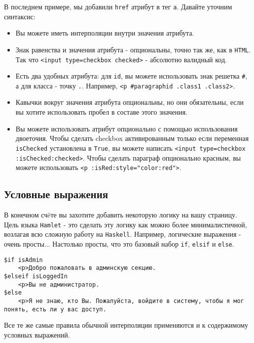 В последнем примере, мы добавили \texttt{href} атрибут в тег \texttt{a}.
Давайте уточним синтаксис:

\begin{itemize}
    \item Вы можете иметь интерполяции внутри значения атрибута.
    \item Знак равенства и значения атрибута - опциональны, точно так же, как в
        \texttt{HTML}.  Так что \lstinline!<input type=checkbox checked>! -
        абсолютно валидный код.
    \item Есть два удобных атрибута: для \lstinline!id!, вы можете использовать
        знак решетка \texttt{\#}, а для класса - точку \texttt{.}. Например,
        \lstinline!<p #paragraphid .class1 .class2>!.
    \item Кавычки вокруг значения атрибута опциональны, но они обязательны,
        если вы хотите использовать пробел в составе этого значения.
    \item Вы можете использовать атрибут опционально с помощью использования
        двоеточия.  Чтобы сделать checkbox активированным только если
        переменная \lstinline!isChecked!  установлена в \lstinline!True!, вы
        можете написать
        \lstinline!<input type=checkbox :isChecked:checked>!.  Чтобы сделать
        параграф опционально красным, вы можете использовать
        \lstinline!<p :isRed:style="color:red">!.
\end{itemize}


\subsection{Условные выражения}

В конечном счëте вы захотите добавить некоторую логику на вашу страницу. Цель
языка \texttt{Hamlet} - это сделать эту логику как можно более минималистичной,
возлагая всю сложную работу на \texttt{Haskell}. Например, логические выражения
- очень просты...  Настолько просты, что это базовый набор \texttt{if},
\texttt{elsif} и \texttt{else}.

\begin{lstlisting}
$if isAdmin
    <p>Добро пожаловать в админскую секцию.
$elseif isLoggedIn
    <p>Вы не администратор.
$else
    <p>Я не знаю, кто Вы. Пожалуйста, войдите в систему, чтобы я мог понять, есть ли у вас доступ.
\end{lstlisting}

Все те же самые правила обычной интерполяции применяются и к содержимому
условных выражений.

